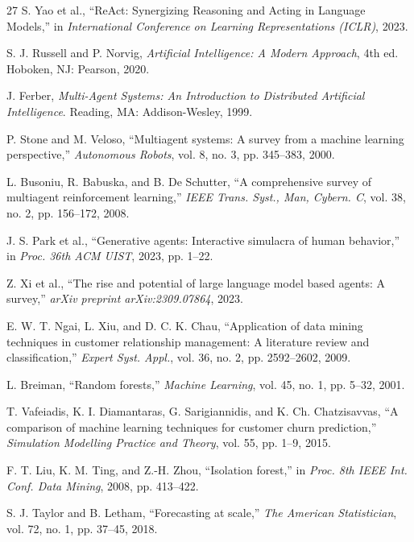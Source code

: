 \documentclass[conference]{IEEEtran}
\begin{document}
\begin{thebibliography}{27}
 S. Yao et al., ``ReAct: Synergizing Reasoning and Acting in Language Models,'' in \textit{International Conference on Learning Representations (ICLR)}, 2023.

 S. J. Russell and P. Norvig, \textit{Artificial Intelligence: A Modern Approach}, 4th ed. Hoboken, NJ: Pearson, 2020.

 J. Ferber, \textit{Multi-Agent Systems: An Introduction to Distributed Artificial Intelligence}. Reading, MA: Addison-Wesley, 1999.

 P. Stone and M. Veloso, ``Multiagent systems: A survey from a machine learning perspective,'' \textit{Autonomous Robots}, vol. 8, no. 3, pp. 345--383, 2000.

 L. Busoniu, R. Babuska, and B. De Schutter, ``A comprehensive survey of multiagent reinforcement learning,'' \textit{IEEE Trans. Syst., Man, Cybern. C}, vol. 38, no. 2, pp. 156--172, 2008.

 J. S. Park et al., ``Generative agents: Interactive simulacra of human behavior,'' in \textit{Proc. 36th ACM UIST}, 2023, pp. 1--22.

 Z. Xi et al., ``The rise and potential of large language model based agents: A survey,'' \textit{arXiv preprint arXiv:2309.07864}, 2023.

 E. W. T. Ngai, L. Xiu, and D. C. K. Chau, ``Application of data mining techniques in customer relationship management: A literature review and classification,'' \textit{Expert Syst. Appl.}, vol. 36, no. 2, pp. 2592--2602, 2009.

 L. Breiman, ``Random forests,'' \textit{Machine Learning}, vol. 45, no. 1, pp. 5--32, 2001.

 T. Vafeiadis, K. I. Diamantaras, G. Sarigiannidis, and K. Ch. Chatzisavvas, ``A comparison of machine learning techniques for customer churn prediction,'' \textit{Simulation Modelling Practice and Theory}, vol. 55, pp. 1--9, 2015.

 F. T. Liu, K. M. Ting, and Z.-H. Zhou, ``Isolation forest,'' in \textit{Proc. 8th IEEE Int. Conf. Data Mining}, 2008, pp. 413--422.

 S. J. Taylor and B. Letham, ``Forecasting at scale,'' \textit{The American Statistician}, vol. 72, no. 1, pp. 37--45, 2018.


\end{thebibliography}
\end{document}
